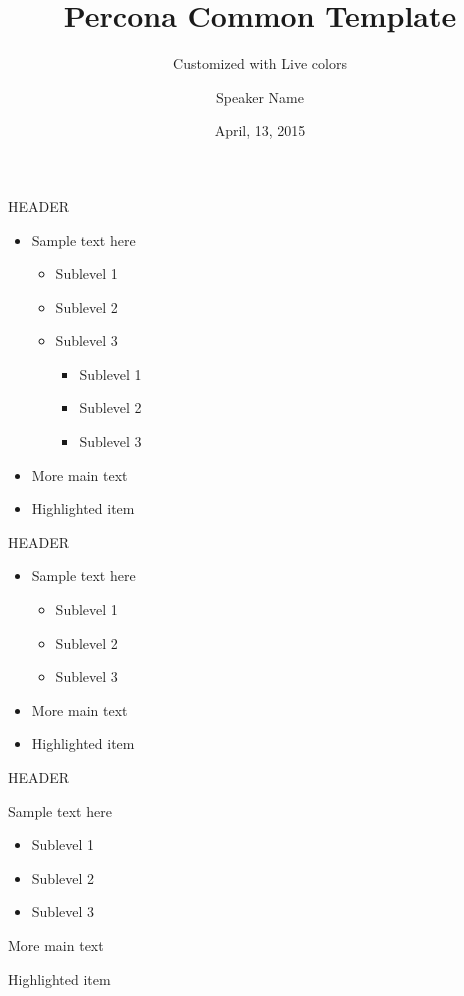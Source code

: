 \documentclass{beamer}
\title[Percona Common Template]{Percona Common Template}
\subtitle{Customized with Live colors}
\author{Speaker Name}
\date{April, 13, 2015}
\begin{document}
	
	\begin{frame}
		\titlepage
	\end{frame}
	
	\note{some note}
	
	
	\begin{frame}{HEADER}
		\begin{itemize} 
			\item Sample text here
			\begin{itemize}
				\item Sublevel 1
				\item Sublevel 2
				\item Sublevel 3
				
				\begin{itemize}
					\item Sublevel 1
					\item Sublevel 2
					\item Sublevel 3
				\end{itemize}
			\end{itemize}
			\item More main text
			\item \alert{Highlighted item}
		\end{itemize}
	\end{frame}
	
	
	
	\begin{frame}{HEADER}
		\begin{itemize} 
			\item Sample text here
			\begin{itemize}
				\item Sublevel 1
				\item Sublevel 2
				\item Sublevel 3
			\end{itemize}
			\item More main text
			\item \alert{Highlighted item}
		\end{itemize}
	\end{frame}
	
	\begin{frame}{HEADER}
		\begin{vfilleditems}
			\item Sample text here
			\begin{itemize}
				\item Sublevel 1
				\item Sublevel 2
				\item Sublevel 3
			\end{itemize}
			\item More main text
			\item \alert{Highlighted item}
		\end{vfilleditems}
	\end{frame}
		
\end{document}
